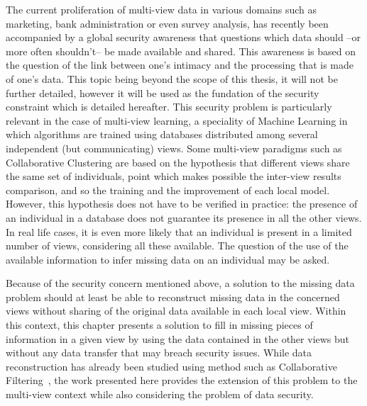 The current proliferation of multi-view data in various domains such as marketing, bank administration or even survey analysis, has recently been accompanied by a global security awareness that questions which data should --or more often shouldn't-- be made available and shared. This awareness is based on the question of the link between one's intimacy and the processing that is made of one's data. This topic being beyond the scope of this thesis, it will not be further detailed, however it will be used as the fundation of the security constraint which is detailed hereafter. This security problem is particularly relevant in the case of multi-view learning, a speciality of Machine Learning in which algorithms are trained using databases distributed among several independent (but communicating) views. Some multi-view paradigms such as Collaborative Clustering are based on the hypothesis that different views share the same set of individuals, point which makes possible the inter-view results comparison, and so the training and the improvement of each local model. However, this hypothesis does not have to be verified in practice: the presence of an individual in a database does not guarantee its presence in all the other views. In real life cases, it is even more likely that an individual is present in a limited number of views, considering all these available. The question of the use of the available information to infer missing data on an individual may be asked.
	
Because of the security concern mentioned above, a solution to the missing data problem should at least be able to reconstruct missing data in the concerned views without sharing of the original data available in each local view.	Within this context, this chapter presents a solution to fill in missing pieces of information in a given view by using the data contained in the other views but without any data transfer that may breach security issues. While data reconstruction has already been studied using method such as Collaborative Filtering~\cite{koren2015advances}, the work presented here provides the extension of this problem to the multi-view context while also considering the problem of data security.

